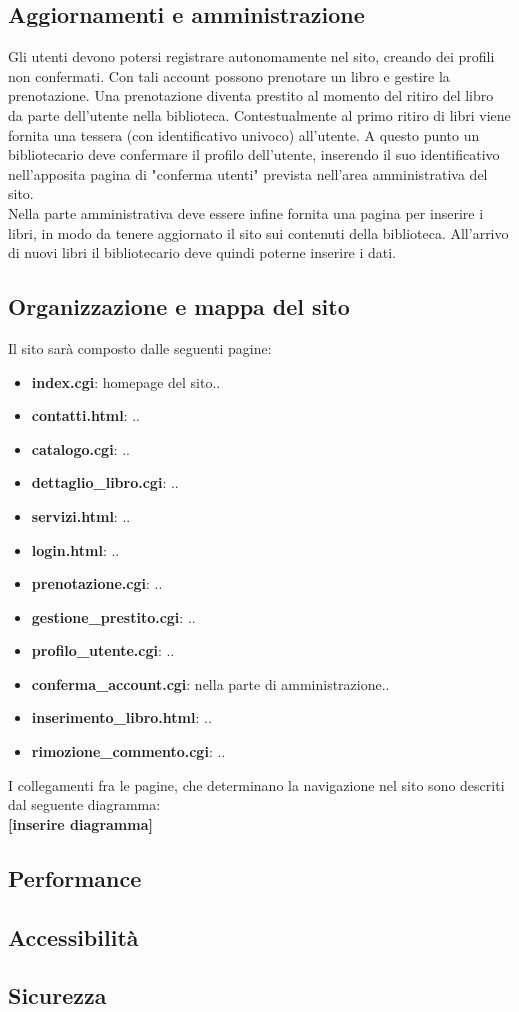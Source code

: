 \subsection{Aggiornamenti e amministrazione}
Gli utenti devono potersi registrare autonomamente nel sito, creando dei profili non confermati. Con tali account possono prenotare un libro e gestire la prenotazione. Una prenotazione diventa prestito al momento del ritiro del libro da parte dell'utente nella biblioteca. Contestualmente al primo ritiro di libri viene fornita una tessera (con identificativo univoco) all'utente. A questo punto un bibliotecario deve confermare il profilo dell'utente, inserendo il suo identificativo nell'apposita pagina di "conferma utenti" prevista nell'area amministrativa del sito.\\
Nella parte amministrativa deve essere infine fornita una pagina per inserire i libri, in modo da tenere aggiornato il sito sui contenuti della biblioteca. All'arrivo di nuovi libri il bibliotecario deve quindi poterne inserire i dati.


\subsection{Organizzazione e mappa del sito}
Il sito sarà composto dalle seguenti pagine:
\begin{itemize}
	\item \textbf{index.cgi}: homepage del sito..
	\item \textbf{contatti.html}: ..
	\item \textbf{catalogo.cgi}: ..
	\item \textbf{dettaglio\_libro.cgi}: ..
	\item \textbf{servizi.html}: ..
	\item \textbf{login.html}: ..
	\item \textbf{prenotazione.cgi}: ..
	\item \textbf{gestione\_prestito.cgi}: ..
	\item \textbf{profilo\_utente.cgi}: ..
	\item \textbf{conferma\_account.cgi}: nella parte di amministrazione..
	\item \textbf{inserimento\_libro.html}: ..
	\item \textbf{rimozione\_commento.cgi}: ..
\end{itemize}
I collegamenti fra le pagine, che determinano la navigazione nel sito sono descriti dal seguente diagramma:\\
\textbf{[inserire diagramma]}


\subsection{Performance}


\subsection{Accessibilità}


\subsection{Sicurezza}